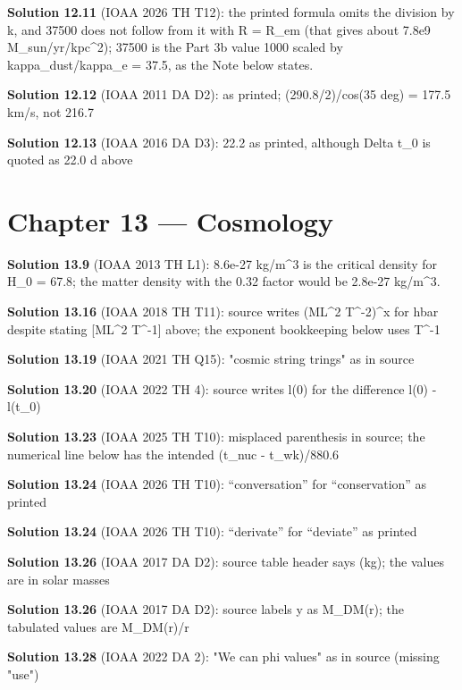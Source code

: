 \noindent\textbf{Solution 12.11} (IOAA 2026 TH T12): the printed formula omits the division by k, and 37500 does not follow from it with R = R\_em (that gives about 7.8e9 M\_sun/yr/kpc\^{}2); 37500 is the Part 3b value 1000 scaled by kappa\_dust/kappa\_e = 37.5, as the Note below states.
\smallskip

\noindent\textbf{Solution 12.12} (IOAA 2011 DA D2): as printed; (290.8/2)/cos(35 deg) = 177.5 km/s, not 216.7
\smallskip

\noindent\textbf{Solution 12.13} (IOAA 2016 DA D3): 22.2 as printed, although Delta t\_0 is quoted as 22.0 d above
\smallskip

\section*{Chapter 13 --- Cosmology}

\noindent\textbf{Solution 13.9} (IOAA 2013 TH L1): 8.6e-27 kg/m\^{}3 is the critical density for H\_0 = 67.8; the matter density with the 0.32 factor would be 2.8e-27 kg/m\^{}3.
\smallskip

\noindent\textbf{Solution 13.16} (IOAA 2018 TH T11): source writes (ML\^{}2 T\^{}{-2})\^{}x for hbar despite stating [ML\^{}2 T\^{}{-1}] above; the exponent bookkeeping below uses T\^{}{-1}
\smallskip

\noindent\textbf{Solution 13.19} (IOAA 2021 TH Q15): "cosmic string trings" as in source
\smallskip

\noindent\textbf{Solution 13.20} (IOAA 2022 TH 4): source writes l(0) for the difference l(0) - l(t\_0)
\smallskip

\noindent\textbf{Solution 13.23} (IOAA 2025 TH T10): misplaced parenthesis in source; the numerical line below has the intended (t\_nuc - t\_wk)/880.6
\smallskip

\noindent\textbf{Solution 13.24} (IOAA 2026 TH T10): ``conversation'' for ``conservation'' as printed
\smallskip

\noindent\textbf{Solution 13.24} (IOAA 2026 TH T10): ``derivate'' for ``deviate'' as printed
\smallskip

\noindent\textbf{Solution 13.26} (IOAA 2017 DA D2): source table header says (kg); the values are in solar masses
\smallskip

\noindent\textbf{Solution 13.26} (IOAA 2017 DA D2): source labels y as M\_DM(r); the tabulated values are M\_DM(r)/r
\smallskip

\noindent\textbf{Solution 13.28} (IOAA 2022 DA 2): "We can phi values" as in source (missing "use")
\smallskip


